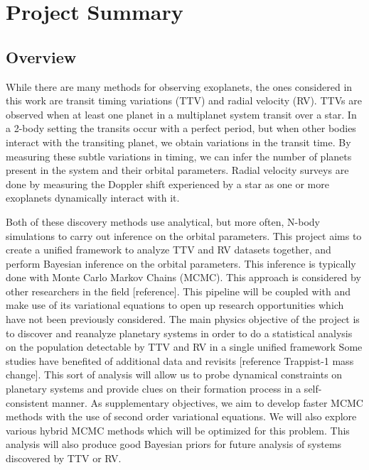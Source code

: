 \section{Project Summary}
\subsection{Overview}
While there are many methods for observing exoplanets, the ones considered in this work are transit timing variations (TTV) and radial velocity (RV). 
TTVs are observed when at least one planet in a multiplanet system transit over a star. 
In a 2-body setting the transits occur with a perfect period, but when other bodies interact with the transiting planet, we obtain variations in the transit time.
By measuring these subtle variations in timing, we can infer the number of planets present in the system and their orbital parameters.
Radial velocity surveys are done by measuring the Doppler shift experienced by a star as one or more exoplanets dynamically interact with it.


Both of these discovery methods use analytical, but more often, N-body simulations to carry out inference on the orbital parameters.
This project aims to create a unified framework to analyze TTV and RV datasets together, and perform Bayesian inference on the orbital parameters.
This inference is typically done with Monte Carlo Markov Chains (MCMC).
This approach is considered by other researchers in the field [reference].
This pipeline will be coupled with \reb and make use of its variational equations to open up research opportunities which have not been previously considered.
The main physics objective of the project is to discover and reanalyze planetary systems in order to do a statistical analysis on the population detectable by TTV and RV in a single unified framework 
Some studies have benefited of additional data and revisits [reference Trappist-1 mass change].
This sort of analysis will allow us to probe dynamical constraints on planetary systems and provide clues on their formation process in a self-consistent manner.
As supplementary objectives, we aim to develop faster MCMC methods with the use of second order variational equations.
We will also explore various hybrid MCMC methods which will be optimized for this problem.
This analysis will also produce good Bayesian priors for future analysis of systems discovered by TTV or RV.


